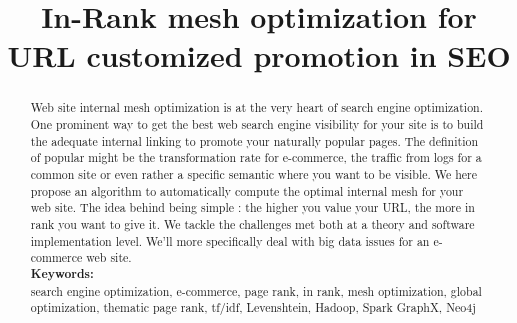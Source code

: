 \documentclass{iSWAGArticle}
\title{In-Rank mesh optimization for URL customized promotion in SEO}
\author{\iSWAGAuthor{Stefan Duprey\\
  Cdiscount\\
  stefan.duprey@cdiscount.com} \and \iSWAGAuthor{Fabien Jaunas\\
  Cdiscount\\
  fabien.jaunas@cdiscount.com}}
\begin{document}
  \maketitle
  \begin{abstract}
  Web site internal mesh optimization is at the very heart of search engine optimization. 
  One prominent way to get the best web search engine visibility for your site 
  is to build the adequate internal linking to promote your naturally popular pages. 
  The definition of popular might be the transformation rate for e-commerce, 
  the traffic from logs for a common site or even rather a specific semantic where you want to be visible. 
  We here propose an algorithm to automatically compute the optimal internal mesh for your web site. The idea
  behind being simple : the higher you value your URL, the more in rank you want to give it.
  We tackle the challenges met both at a theory and software implementation level. 
  We'll more specifically deal with big data issues for an e-commerce web site.
  \\\newline
  \indent \textbf{Keywords: }
  \\\newline
  search engine optimization, e-commerce, page rank, in rank, mesh optimization, global optimization, thematic page rank, tf/idf, Levenshtein, Hadoop, Spark GraphX, Neo4j
  \end{abstract}
\end{document}
